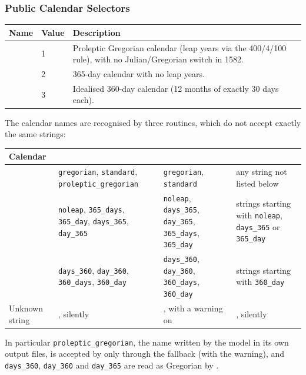 \subsubsection{Public Calendar Selectors}

\begin{longtable}{L{3cm} L{2cm} L{9cm}}
  \toprule
  \textbf{Name} & \textbf{Value} & \textbf{Description} \\
  \midrule
  \endhead
  \bottomrule
  \endfoot
   & 1 & Proleptic Gregorian calendar (leap years via the
    400/4/100 rule), with no Julian/Gregorian switch in 1582. \\
      & 2 & 365-day calendar with no leap years. \\
        & 3 & Idealised 360-day calendar (12 months of exactly 30
    days each). \\
\end{longtable}

The calendar names are recognised by three routines, which do not accept
exactly the same strings:

\begin{longtable}{L{3.2cm} L{3.6cm} L{3.6cm} L{3.6cm}}
  \toprule
  \textbf{Calendar} &  &  &
     \\
  \midrule
  \endhead
  \bottomrule
  \endfoot
   &
    \texttt{gregorian}, \texttt{standard}, \texttt{proleptic\_gregorian} &
    \texttt{gregorian}, \texttt{standard} &
    any string not listed below \\
   &
    \texttt{noleap}, \texttt{365\_days}, \texttt{365\_day},
    \texttt{days\_365}, \texttt{day\_365} &
    \texttt{noleap}, \texttt{days\_365}, \texttt{day\_365},
    \texttt{365\_days}, \texttt{365\_day} &
    strings starting with \texttt{noleap}, \texttt{days\_365} or
    \texttt{365\_day} \\
   &
    \texttt{days\_360}, \texttt{day\_360}, \texttt{360\_days},
    \texttt{360\_day} &
    \texttt{days\_360}, \texttt{day\_360}, \texttt{360\_days},
    \texttt{360\_day} &
    strings starting with \texttt{360\_day} \\
  Unknown string &
    , silently &
    , with a warning on  &
    , silently \\
\end{longtable}

\noindent In particular \texttt{proleptic\_gregorian}, the name written by the
model in its own output files, is accepted by  only
through the fallback (with the warning), and \texttt{days\_360},
\texttt{day\_360} and \texttt{day\_365} are read as Gregorian by
.

